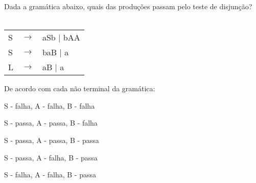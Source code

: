 \question[10]
Dada a gramática abaixo, quais das produções passam pelo teste de disjunção?\\
\\
\begin{tabular}{|l c l}
	S & $\rightarrow$ & aSb | bAA \\
    S & $\rightarrow$ & b{aB} | a \\
	L & $\rightarrow$ & aB | a \\
\end{tabular}

De acordo com cada não terminal da gramática:
\begin{choices}
\item S - falha, A - falha, B - falha
\item S - passa, A - passa, B - falha %
\item S - passa, A - passa, B - passa
\item S - passa, A - falha, B - passa
\item S - falha, A - falha, B - passa
\end{choices}
\answerline

